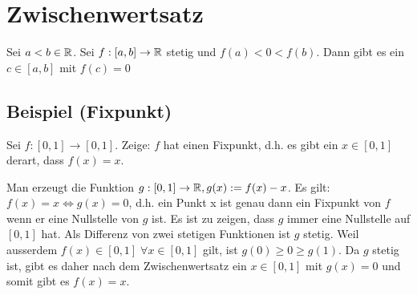 \section{Zwischenwertsatz}
Sei $a < b \in \mathbb{R}$. Sei $f:[a,b] \rightarrow \mathbb{R}$ stetig und $f(a)<0<f(b)$. Dann gibt es ein $c \in [a,b]$ mit $f(c) = 0$


\subsection{Beispiel (Fixpunkt)}
Sei $f: [0,1] \to [0,1]$. Zeige: $f$ hat einen Fixpunkt, d.h. es gibt ein $x
\in [0,1]$ derart, dass $f(x) = x$.

Man erzeugt die Funktion $g: [0,1] \to \mathbb{R}, g(x) := f(x) - x$. Es gilt: $f(x) =
x \Leftrightarrow g(x) = 0$, d.h. ein Punkt x ist genau dann ein Fixpunkt von
$f$ wenn er eine Nullstelle von $g$ ist. Es ist zu zeigen, dass $g$ immer eine
Nullstelle auf $[0,1]$ hat. Als Differenz von zwei stetigen Funktionen ist $g$
stetig. Weil ausserdem $f(x) \in [0,1] \; \forall x \in [0,1]$ gilt, ist $g(0)
\geq 0 \geq g(1)$. Da $g$ stetig ist, gibt es daher nach dem Zwischenwertsatz
ein $x \in [0,1]$ mit $g(x) = 0$ und somit gibt es $f(x) = x$.
